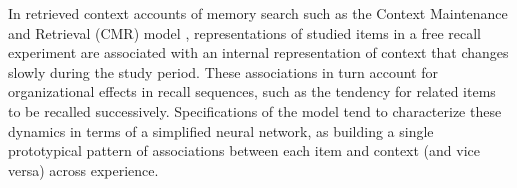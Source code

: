 In retrieved context accounts of memory search such as the Context Maintenance and Retrieval (CMR) model \citep*{polyn2009context}, representations of studied items in a free recall experiment are associated with an internal representation of context that changes slowly during the study period. These associations in turn account for organizational effects in recall sequences, such as the tendency for related items to be recalled successively. Specifications of the model tend to characterize these dynamics in terms of a simplified neural network, as building a single prototypical pattern of associations between each item and context (and vice versa) across experience. 